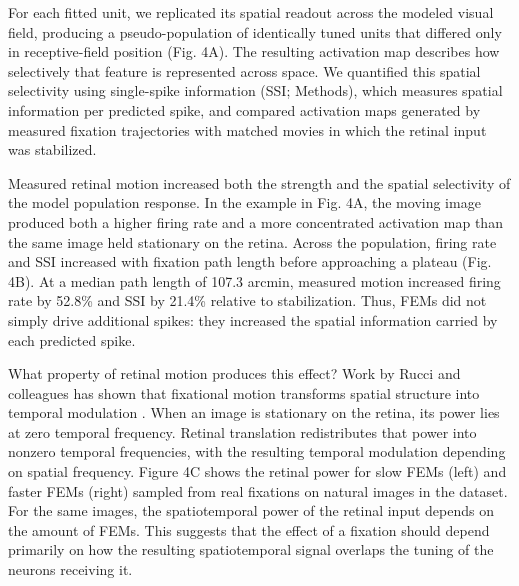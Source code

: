 \documentclass{lite}
\begin{document}
For each fitted unit, we replicated its spatial readout across the modeled visual field, producing a pseudo-population of identically tuned units that differed only in receptive-field position (Fig. 4A). The resulting activation map describes how selectively that feature is represented across space. We quantified this spatial selectivity using single-spike information (SSI; Methods), which measures spatial information per predicted spike, and compared activation maps generated by measured fixation trajectories with matched movies in which the retinal input was stabilized.

Measured retinal motion increased both the strength and the spatial selectivity of the model population response. In the example in Fig. 4A, the moving image produced both a higher firing rate and a more concentrated activation map than the same image held stationary on the retina. Across the population, firing rate and SSI increased with fixation path length before approaching a plateau (Fig. 4B). At a median path length of 107.3 arcmin, measured motion increased firing rate by 52.8\% and SSI by 21.4\% relative to stabilization. Thus, FEMs did not simply drive additional spikes: they increased the spatial information carried by each predicted spike.

What property of retinal motion produces this effect? Work by Rucci and colleagues has shown that fixational motion transforms spatial structure into temporal modulation \cite{rucci2015unsteady,kuang2012temporal}. When an image is stationary on the retina, its power lies at zero temporal frequency. Retinal translation redistributes that power into nonzero temporal frequencies, with the resulting temporal modulation depending on spatial frequency. Figure 4C shows the retinal power for slow FEMs (left) and faster FEMs (right) sampled from real fixations on natural images in the dataset. For the same images, the spatiotemporal power of the retinal input depends on the amount of FEMs. This suggests that the effect of a fixation should depend primarily on how the resulting spatiotemporal signal overlaps the tuning of the neurons receiving it.
\end{document}
